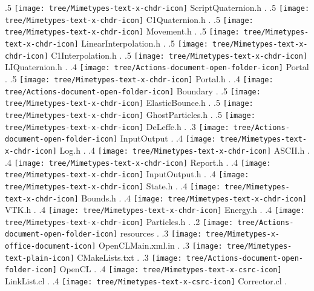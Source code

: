 {.5 { \texttt{[image: tree/Mimetypes-text-x-chdr-icon]} ScriptQuaternion.h }.
.5 { \texttt{[image: tree/Mimetypes-text-x-chdr-icon]} C1Quaternion.h }.
.5 { \texttt{[image: tree/Mimetypes-text-x-chdr-icon]} Movement.h }.
.5 { \texttt{[image: tree/Mimetypes-text-x-chdr-icon]} LinearInterpolation.h }.
.5 { \texttt{[image: tree/Mimetypes-text-x-chdr-icon]} C1Interpolation.h }.
.5 { \texttt{[image: tree/Mimetypes-text-x-chdr-icon]} LIQuaternion.h }.
.4 { \texttt{[image: tree/Actions-document-open-folder-icon]} Portal }.
.5 { \texttt{[image: tree/Mimetypes-text-x-chdr-icon]} Portal.h }.
.4 { \texttt{[image: tree/Actions-document-open-folder-icon]} Boundary }.
.5 { \texttt{[image: tree/Mimetypes-text-x-chdr-icon]} ElasticBounce.h }.
.5 { \texttt{[image: tree/Mimetypes-text-x-chdr-icon]} GhostParticles.h }.
.5 { \texttt{[image: tree/Mimetypes-text-x-chdr-icon]} DeLeffe.h }.
.3 { \texttt{[image: tree/Actions-document-open-folder-icon]} InputOutput }.
.4 { \texttt{[image: tree/Mimetypes-text-x-chdr-icon]} Log.h }.
.4 { \texttt{[image: tree/Mimetypes-text-x-chdr-icon]} ASCII.h }.
.4 { \texttt{[image: tree/Mimetypes-text-x-chdr-icon]} Report.h }.
.4 { \texttt{[image: tree/Mimetypes-text-x-chdr-icon]} InputOutput.h }.
.4 { \texttt{[image: tree/Mimetypes-text-x-chdr-icon]} State.h }.
.4 { \texttt{[image: tree/Mimetypes-text-x-chdr-icon]} Bounds.h }.
.4 { \texttt{[image: tree/Mimetypes-text-x-chdr-icon]} VTK.h }.
.4 { \texttt{[image: tree/Mimetypes-text-x-chdr-icon]} Energy.h }.
.4 { \texttt{[image: tree/Mimetypes-text-x-chdr-icon]} Particles.h }.
.2 { \texttt{[image: tree/Actions-document-open-folder-icon]} resources }.
.3 { \texttt{[image: tree/Mimetypes-x-office-document-icon]} OpenCLMain.xml.in }.
.3 { \texttt{[image: tree/Mimetypes-text-plain-icon]} CMakeLists.txt }.
.3 { \texttt{[image: tree/Actions-document-open-folder-icon]} OpenCL }.
.4 { \texttt{[image: tree/Mimetypes-text-x-csrc-icon]} LinkList.cl }.
.4 { \texttt{[image: tree/Mimetypes-text-x-csrc-icon]} Corrector.cl }.
}
